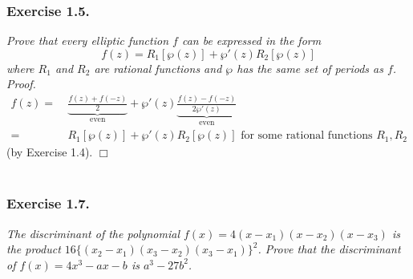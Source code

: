 \documentclass{article}
\begin{document}



\subsubsection*{Exercise 1.5.}
\emph{Prove that every elliptic function $f$ can be expressed in the form
\[
  f(z) = R_1[\wp(z)] + \wp'(z) R_2[\wp(z)]
\]
where $R_1$ and $R_2$ are rational functions and $\wp$ has the same set of periods as $f$.} \\



\emph{Proof.}
  \begin{align*}
    f(z)
    =&\:
    \underbrace{\frac{f(z)+f(-z)}{2}}_{\text{even}}
      + \wp'(z) \underbrace{\frac{f(z)-f(-z)}{2 \wp'(z)}}_{\text{even}} \\
    =&\: R_1[\wp(z)] + \wp'(z) R_2[\wp(z)]
      \text{ for some rational functions $R_1, R_2$}
  \end{align*}
  (by Exercise 1.4).
$\Box$ \\\\






\subsubsection*{Exercise 1.7.}
\emph{The discriminant of the polynomial $f(x) = 4(x-x_1)(x-x_2)(x-x_3)$
is the product $16 \{(x_2-x_1)(x_3-x_2)(x_3-x_1)\}^2$.
Prove that the discriminant of $f(x) = 4x^3 - ax - b$ is $a^3 - 27b^2$.} \\
\end{document}
